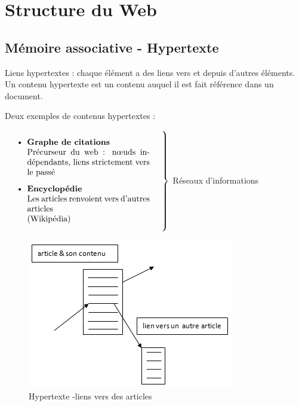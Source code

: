 %
%
%
%
%

\chapter{Structure du Web} %


\section{Mémoire associative - Hypertexte}

Liens hypertextes : chaque élément a des liens vers et depuis d'autres éléments. Un contenu hypertexte est un contenu auquel il est fait référence dans un document.

\vspace{0.5cm}
Deux exemples de contenus hypertextes :

$
\left. 
\parbox{0.5\linewidth}{
\begin{itemize}
\item \textbf{Graphe de citations} \\
		Précurseur du web : nœuds indépendants, liens strictement vers le passé
\item \textbf{Encyclopédie} \\
		Les articles renvoient vers d'autres articles \\ (Wikipédia)
\end{itemize}
}%
\hspace{0.5cm} \right\}
$ Réseaux d'informations




\begin{figure}[!h]
\centering
\includegraphics{images/23_image1.png}
\caption{Hypertexte -liens vers des articles}
\label{hypertexte}
\end{figure}

